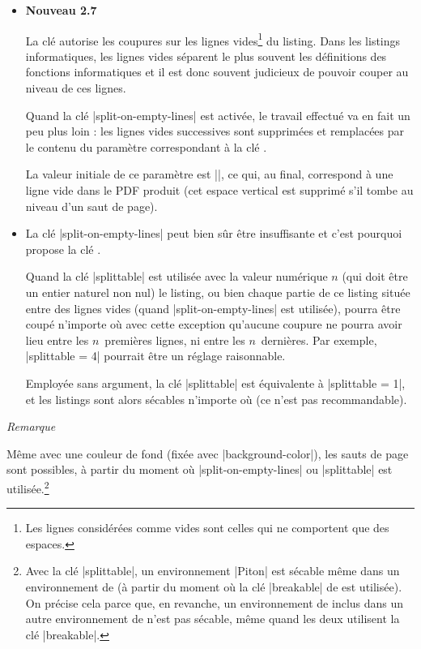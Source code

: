 \documentclass[dvipsnames,svgnames]{article}
\begin{document}
\begin{itemize}
\item \colorbox{yellow!50}{\textbf{Nouveau 2.7}}\par\nobreak

La clé  autorise les coupures sur les lignes vides\footnote{Les lignes considérées
  comme vides sont celles qui ne comportent que des espaces.} du listing. Dans les listings informatiques, les
lignes vides séparent le plus souvent les définitions des fonctions informatiques et il est donc souvent judicieux
de pouvoir couper au niveau de ces lignes.

Quand la clé |split-on-empty-lines| est activée, le travail effectué va en fait un peu plus loin : les lignes vides
successives sont supprimées et remplacées par le contenu du paramètre correspondant à la clé
. 

La valeur initiale de ce paramètre est |\vspace{\baselineskip}\vspace{-1.25pt}|, ce qui, au final, correspond à une
ligne vide dans le PDF produit (cet espace vertical est supprimé s'il tombe au niveau d'un saut de page).

\medskip
\item La clé |split-on-empty-lines| peut bien sûr être insuffisante et c'est pourquoi  propose la clé
. 

Quand la clé |splittable| est utilisée avec la valeur numérique $n$ (qui doit être un entier naturel non nul) le
listing, ou bien chaque partie de ce listing située entre des lignes vides (quand |split-on-empty-lines| est
utilisée), pourra être coupé n'importe où avec cette exception qu'aucune coupure ne pourra avoir lieu entre les
$n$~premières lignes, ni entre les $n$~dernières. Par exemple, |splittable = 4| pourrait être un réglage raisonnable.

Employée sans argument, la clé |splittable| est équivalente à |splittable = 1|, et les listings sont alors sécables
n'importe où (ce n'est pas recommandable). 

\end{itemize}

\medskip
\emph{Remarque}\par\nobreak

Même avec une couleur de fond (fixée avec |background-color|), les sauts de page sont possibles, à partir du moment
où |split-on-empty-lines| ou |splittable| est utilisée.\footnote{Avec la clé |splittable|, un environnement
  |{Piton}| est sécable même dans un environnement de  (à partir du moment où la clé |breakable| de
   est utilisée). On précise cela parce que, en revanche, un environnement de  inclus
  dans un autre environnement de  n'est pas sécable, même quand les deux utilisent la clé
  |breakable|.}
\end{document}
